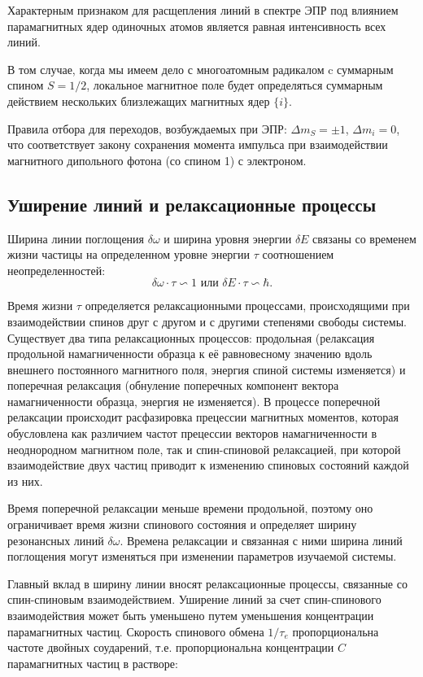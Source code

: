 \documentclass[a4paper,14pt]{article}
\begin{document}
\par 
Характерным признаком для расщепления линий в спектре ЭПР под
влиянием парамагнитных ядер одиночных атомов является равная
интенсивность всех линий.
\par 
В том случае, когда мы имеем дело с многоатомным радикалом c
суммарным спином $ S = 1/2 $, локальное магнитное поле будет определяться суммарным действием нескольких близлежащих магнитных ядер $ \{i\} $.
\par 
Правила отбора для переходов, возбуждаемых при ЭПР: $ \Delta m_S = \pm1 $, $ \Delta m_i = 0 $, что соответствует закону сохранения момента импульса при взаимодействии магнитного дипольного фотона (со спином 1) с электроном.
\subsection{Уширение линий и релаксационные процессы}
Ширина линии поглощения $ \delta \omega $ и ширина уровня энергии $ \delta E $ связаны со временем жизни частицы на определенном уровне энергии $ \tau $ соотношением неопределенностей:
\begin{equation}
	\delta \omega \cdot \tau \backsim 1 \text{ или } \delta E \cdot \tau \backsim \hbar.
\end{equation}
\par 
Время жизни $ \tau $ определяется релаксационными процессами, происходящими при взаимодействии спинов друг с другом и с другими степенями свободы системы. Существует два типа релаксационных процессов: продольная (релаксация продольной намагниченности образца к её равновесному значению вдоль внешнего постоянного магнитного поля, энергия спиной системы изменяется) и поперечная релаксация (обнуление поперечных компонент вектора намагниченности образца, энергия не изменяется). В процессе поперечной релаксации происходит расфазировка прецессии магнитных моментов, которая обусловлена как различием частот прецессии векторов намагниченности в неоднородном магнитном поле, так и спин-спиновой релаксацией, при которой взаимодействие двух частиц приводит к изменению спиновых состояний каждой из них.
\par 
Время поперечной релаксации меньше времени продольной, поэтому оно ограничивает время жизни спинового состояния и определяет ширину резонансных линий $ \delta \omega $. Времена релаксации и связанная с ними ширина линий поглощения могут изменяться при изменении параметров изучаемой системы.
\par 
Главный вклад в ширину линии вносят релаксационные процессы, связанные со спин-спиновым взаимодействием. Уширение линий за счет спин-спинового взаимодействия может быть уменьшено путем уменьшения концентрации парамагнитных частиц. Скорость спинового обмена $ 1/\tau_e $ пропорциональна частоте двойных соударений, т.е. пропорциональна концентрации $ C $ парамагнитных частиц в растворе:
\end{document}
